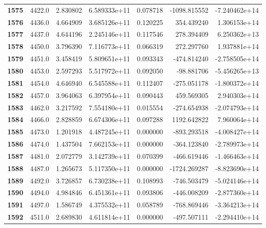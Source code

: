 \documentclass{report}[12pt]
\begin{document}
\begin{center}
\begin{tabular}{lrrrrrr}
\textbf{1575} &         4422.0 &   2.830802 &  6.589333e+11 &    0.078718 & -1098.815552 & -7.240462e+14 \\
\textbf{1576} &         4436.0 &   4.664909 &  3.685126e+11 &    0.120225 &   354.439240 &  1.306153e+14 \\
\textbf{1577} &         4437.0 &   4.644196 &  2.245146e+11 &    0.117546 &   278.394409 &  6.250362e+13 \\
\textbf{1578} &         4450.0 &   3.796390 &  7.116773e+11 &    0.066319 &   272.297760 &  1.937881e+14 \\
\textbf{1579} &         4451.0 &   3.458419 &  5.809651e+11 &    0.093343 &  -474.814240 & -2.758505e+14 \\
\textbf{1580} &         4453.0 &   2.597293 &  5.517972e+11 &    0.092050 &   -98.881706 & -5.456265e+13 \\
\textbf{1581} &         4454.0 &   4.646940 &  6.545588e+11 &    0.112407 &  -275.051178 & -1.800372e+14 \\
\textbf{1582} &         4457.0 &   3.964063 &  6.397954e+11 &    0.090443 &   459.569305 &  2.940303e+14 \\
\textbf{1583} &         4462.0 &   3.217592 &  7.554180e+11 &    0.015554 &  -274.654938 & -2.074793e+14 \\
\textbf{1584} &         4466.0 &   2.828859 &  6.674306e+11 &    0.097288 &  1192.642822 &  7.960064e+14 \\
\textbf{1585} &         4473.0 &   1.201918 &  4.487245e+11 &    0.000000 &  -893.293518 & -4.008427e+14 \\
\textbf{1586} &         4474.0 &   1.437504 &  7.662153e+11 &    0.000000 &  -364.123840 & -2.789973e+14 \\
\textbf{1587} &         4481.0 &   2.072779 &  3.142739e+11 &    0.070399 &  -466.619446 & -1.466463e+14 \\
\textbf{1588} &         4487.0 &   1.265673 &  5.117350e+11 &    0.000000 & -1724.269287 & -8.823690e+14 \\
\textbf{1589} &         4492.0 &   3.726857 &  6.730238e+11 &    0.108993 &  -746.503479 & -5.024146e+14 \\
\textbf{1590} &         4494.0 &   4.984846 &  6.451361e+11 &    0.093806 &  -446.008209 & -2.877360e+14 \\
\textbf{1591} &         4497.0 &   1.586749 &  4.375532e+11 &    0.058789 &  -768.869446 & -3.364213e+14 \\
\textbf{1592} &         4511.0 &   2.689830 &  4.611814e+11 &    0.000000 &  -497.507111 & -2.294410e+14 \\

\end{tabular}
\end{center}
\end{document}
